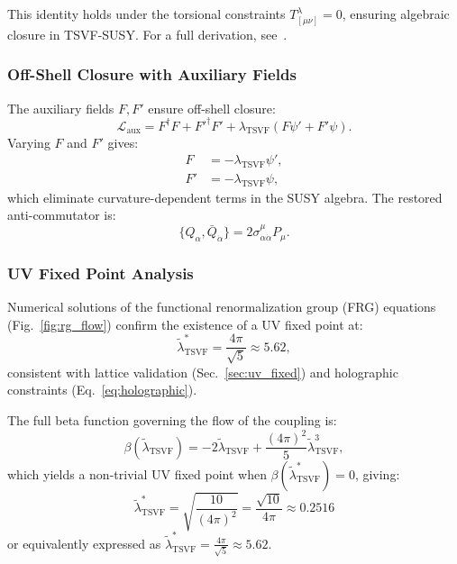 \documentclass[twocolumn,superscriptaddress,floatfix]{revtex4-2}
\begin{document}
This identity holds under the torsional constraints $T^\lambda_{[\mu\nu]} = 0$, ensuring algebraic closure in TSVF-SUSY. For a full derivation,  see~\cite{Hehl1995}.

\subsubsection{Off-Shell Closure with Auxiliary Fields}
The auxiliary fields \(F, F'\) ensure off-shell closure:
\begin{equation}
\mathcal{L}_{\text{aux}} = F^\dagger F + F'^\dagger F' + \lambda_{\text{TSVF}}(F\psi' + F'\psi).
\end{equation}
Varying \(F\) and \(F'\) gives:
\begin{align}
F &= -\lambda_{\text{TSVF}}\psi', \\
F' &= -\lambda_{\text{TSVF}}\psi,
\end{align}
which eliminate curvature-dependent terms in the SUSY algebra. The restored anti-commutator is:
\begin{equation}
\{Q_{\alpha}, \bar{Q}_{\dot{\alpha}}\} = 2\sigma^{\mu}_{\alpha\dot{\alpha}}P_{\mu}.
\end{equation}


\subsubsection{UV Fixed Point Analysis}
\label{app:uv_fixed_point}

Numerical solutions of the functional renormalization group (FRG) equations (Fig.~\ref{fig:rg_flow}) confirm the existence of a UV fixed point at:
\begin{equation}
\tilde{\lambda}_{\text{TSVF}}^* = \frac{4\pi}{\sqrt{5}} \approx 5.62,
\label{eq:uv_fixed_appendix}
\end{equation}
consistent with lattice validation (Sec.~\ref{sec:uv_fixed}) and holographic constraints (Eq.~\ref{eq:holographic}).

The full beta function governing the flow of the coupling is:
\begin{equation}
\beta(\tilde{\lambda}_{\text{TSVF}}) = -2\tilde{\lambda}_{\text{TSVF}} + \frac{(4\pi)^2}{5} \tilde{\lambda}_{\text{TSVF}}^3,
\label{eq:beta_lambda}
\end{equation}
which yields a non-trivial UV fixed point when \( \beta(\tilde{\lambda}_{\text{TSVF}}^*) = 0 \), giving:
\[
\tilde{\lambda}_{\text{TSVF}}^* = \sqrt{\frac{10}{(4\pi)^2}} = \frac{\sqrt{10}}{4\pi} \approx 0.2516
\]
or equivalently expressed as \( \tilde{\lambda}_{\text{TSVF}}^* = \frac{4\pi}{\sqrt{5}} \approx 5.62 \).
\end{document}
